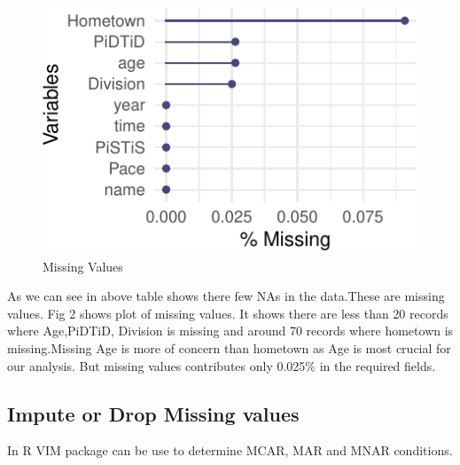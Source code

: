 \documentclass[
]{article}
\begin{document}
\begin{figure}[H]

{\centering \includegraphics{case_study02_files/figure-latex/unnamed-chunk-6-1} 

}

\caption{Missing Values}\label{fig:unnamed-chunk-6}
\end{figure}

As we can see in above table shows there few NAs in the data.These are
missing values. Fig 2 shows plot of missing values. It shows there are
less than 20 records where Age,PiDTiD, Division is missing and around 70
records where hometown is missing.Missing Age is more of concern than
hometown as Age is most crucial for our analysis. But missing values
contributes only 0.025\% in the required fields.

\hypertarget{impute-or-drop-missing-values}{%
\subsection{Impute or Drop Missing
values}\label{impute-or-drop-missing-values}}

In R VIM package can be use to determine MCAR, MAR and MNAR conditions.
\end{document}
